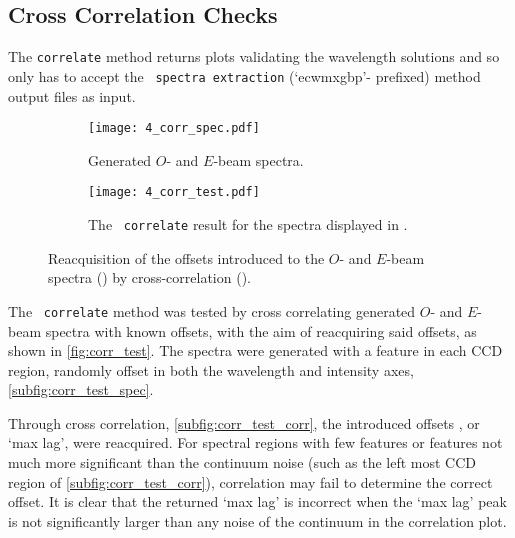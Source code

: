 
\subsection{Cross Correlation Checks} \label{subsec:test_corr}

The \texttt{correlate} method returns plots validating the wavelength solutions and so only has to accept the \polsalt\ \texttt{spectra extraction} (`ecwmxgbp'- prefixed) method output files as input.

\begin{figure}
    \centering
    \begin{subfigure}[b]{\textwidth}
        \centering
        \texttt{[image: 4\_corr\_spec.pdf]}
        \caption{Generated $O$- and $E$-beam spectra.}
        \label{subfig:corr_test_spec}
    \end{subfigure}
    \hfill
    \begin{subfigure}[b]{\textwidth}
        \centering
        \texttt{[image: 4\_corr\_test.pdf]}
        \caption{The \stops\ \texttt{correlate} result for the spectra displayed in .}
        \label{subfig:corr_test_corr}
    \end{subfigure}
    \caption{Reacquisition of the offsets introduced to the $O$- and $E$-beam spectra () by cross-correlation ().}
    \label{fig:corr_test}
\end{figure}

The \stops\ \texttt{correlate} method was tested by cross correlating generated $O$- and $E$-beam spectra with known offsets, with the aim of reacquiring said offsets, as shown in \autoref{fig:corr_test}. The spectra were generated with a feature in each \gls{CCD} region, randomly offset in both the wavelength and intensity axes, \autoref{subfig:corr_test_spec}.

Through cross correlation, \autoref{subfig:corr_test_corr}, the introduced offsets , or `max lag', were reacquired. For spectral regions with few features or features not much more significant than the continuum noise (such as the left most \gls{CCD} region of \autoref{subfig:corr_test_corr}), correlation may fail to determine the correct offset. It is clear that the returned `max lag' is incorrect when the `max lag' peak is not significantly larger than any noise of the continuum in the correlation plot.

